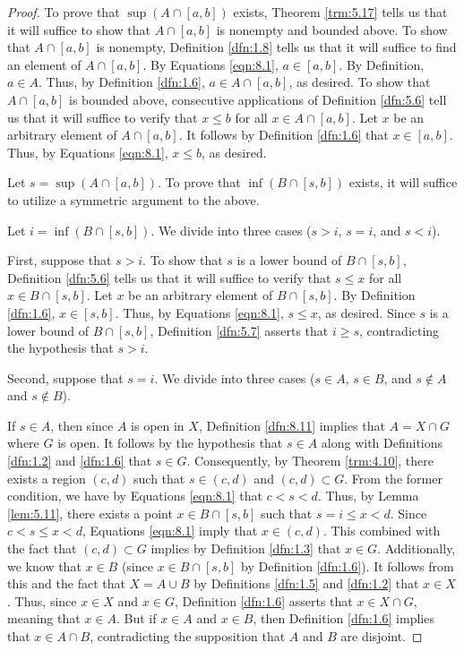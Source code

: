 \documentclass[../main.tex]{subfiles}
\begin{document}
\begin{theorem}
\begin{proof}
        To prove that $\sup(A\cap[a,b])$ exists, Theorem \ref{trm:5.17} tells us that it will suffice to show that $A\cap[a,b]$ is nonempty and bounded above. To show that $A\cap[a,b]$ is nonempty, Definition \ref{dfn:1.8} tells us that it will suffice to find an element of $A\cap[a,b]$. By Equations \ref{eqn:8.1}, $a\in[a,b]$. By Definition, $a\in A$. Thus, by Definition \ref{dfn:1.6}, $a\in A\cap[a,b]$, as desired. To show that $A\cap[a,b]$ is bounded above, consecutive applications of Definition \ref{dfn:5.6} tell us that it will suffice to verify that $x\leq b$ for all $x\in A\cap[a,b]$. Let $x$ be an arbitrary element of $A\cap[a,b]$. It follows by Definition \ref{dfn:1.6} that $x\in[a,b]$. Thus, by Equations \ref{eqn:8.1}, $x\leq b$, as desired.\par\smallskip
        Let $s=\sup(A\cap[a,b])$. To prove that $\inf(B\cap[s,b])$ exists, it will suffice to utilize a symmetric argument to the above.\par\smallskip
        Let $i=\inf(B\cap[s,b])$. We divide into three cases ($s>i$, $s=i$, and $s<i$).\par\smallskip
        First, suppose that $s>i$. To show that $s$ is a lower bound of $B\cap[s,b]$, Definition \ref{dfn:5.6} tells us that it will suffice to verify that $s\leq x$ for all $x\in B\cap[s,b]$. Let $x$ be an arbitrary element of $B\cap[s,b]$. By Definition \ref{dfn:1.6}, $x\in[s,b]$. Thus, by Equations \ref{eqn:8.1}, $s\leq x$, as desired. Since $s$ is a lower bound of $B\cap[s,b]$, Definition \ref{dfn:5.7} asserts that $i\geq s$, contradicting the hypothesis that $s>i$.\par\smallskip
        Second, suppose that $s=i$. We divide into three cases ($s\in A$, $s\in B$, and $s\notin A$ and $s\notin B$).\par
        If $s\in A$, then since $A$ is open in $X$, Definition \ref{dfn:8.11} implies that $A=X\cap G$ where $G$ is open. It follows by the hypothesis that $s\in A$ along with Definitions \ref{dfn:1.2} and \ref{dfn:1.6} that $s\in G$. Consequently, by Theorem \ref{trm:4.10}, there exists a region $(c,d)$ such that $s\in(c,d)$ and $(c,d)\subset G$. From the former condition, we have by Equations \ref{eqn:8.1} that $c<s<d$. Thus, by Lemma \ref{lem:5.11}, there exists a point $x\in B\cap[s,b]$ such that $s=i\leq x<d$. Since $c<s\leq x<d$, Equations \ref{eqn:8.1} imply that $x\in(c,d)$. This combined with the fact that $(c,d)\subset G$ implies by Definition \ref{dfn:1.3} that $x\in G$. Additionally, we know that $x\in B$ (since $x\in B\cap[s,b]$ by Definition \ref{dfn:1.6}). It follows from this and the fact that $X=A\cup B$ by Definitions \ref{dfn:1.5} and \ref{dfn:1.2} that $x\in X$. Thus, since $x\in X$ and $x\in G$, Definition \ref{dfn:1.6} asserts that $x\in X\cap G$, meaning that $x\in A$. But if $x\in A$ and $x\in B$, then Definition \ref{dfn:1.6} implies that $x\in A\cap B$, contradicting the supposition that $A$ and $B$ are disjoint.\par

\end{proof}
\end{theorem}
\end{document}
